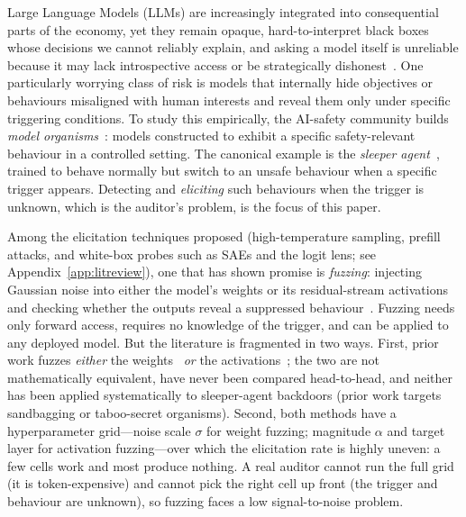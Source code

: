 \documentclass{article}
\begin{document}
Large Language Models (LLMs) are increasingly integrated into consequential parts of the economy, yet they remain opaque, hard-to-interpret black boxes whose decisions we cannot reliably explain, and asking a model itself is unreliable because it may lack introspective access or be strategically dishonest~\citep{bengio2024, greenblatt2024, park2024deception}. One particularly worrying class of risk is models that internally hide objectives or behaviours misaligned with human interests and reveal them only under specific triggering conditions. To study this empirically, the AI-safety community builds \emph{model organisms}~\citep{hubinger2023}: models constructed to exhibit a specific safety-relevant behaviour in a controlled setting. The canonical example is the \emph{sleeper agent}~\citep{hubinger2024}, trained to behave normally but switch to an unsafe behaviour when a specific trigger appears. Detecting and \emph{eliciting} such behaviours when the trigger is unknown, which is the auditor's problem, is the focus of this paper.

Among the elicitation techniques proposed (high-temperature sampling, prefill attacks, and white-box probes such as SAEs and the logit lens; see Appendix~\ref{app:litreview}), one that has shown promise is \emph{fuzzing}: injecting Gaussian noise into either the model's weights or its residual-stream activations and checking whether the outputs reveal a suppressed behaviour~\citep{tice2024, roger2025}. Fuzzing needs only forward access, requires no knowledge of the trigger, and can be applied to any deployed model. But the literature is fragmented in two ways. First, prior work fuzzes \emph{either} the weights~\citep{tice2024, ukaisi2025} \emph{or} the activations~\citep{cywinski2025, roger2025}; the two are not mathematically equivalent, have never been compared head-to-head, and neither has been applied systematically to sleeper-agent backdoors (prior work targets sandbagging or taboo-secret organisms). Second, both methods have a hyperparameter grid---noise scale $\sigma$ for weight fuzzing; magnitude $\alpha$ and target layer for activation fuzzing---over which the elicitation rate is highly uneven: a few cells work and most produce nothing. A real auditor cannot run the full grid (it is token-expensive) and cannot pick the right cell up front (the trigger and behaviour are unknown), so fuzzing faces a low signal-to-noise problem.
\end{document}
